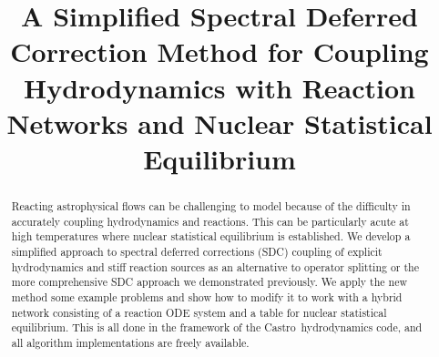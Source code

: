 \documentclass[times,modern]{aastex63}
\newcommand{\castro}{{\sf Castro}}
\begin{document}
\title{A Simplified Spectral Deferred Correction Method for Coupling Hydrodynamics with Reaction Networks and Nuclear Statistical Equilibrium}

\shortauthors{}








\begin{abstract}
Reacting astrophysical flows can be challenging to model because of
the difficulty in accurately coupling hydrodynamics and reactions.
This can be particularly acute at high temperatures where nuclear
statistical equilibrium is established.  We develop a simplified
approach to spectral deferred corrections (SDC) coupling of explicit
hydrodynamics and stiff reaction sources as an alternative to operator
splitting or the more comprehensive SDC approach we demonstrated
previously.  We apply the new method some example problems and show
how to modify it to work with a hybrid network consisting of a
reaction ODE system and a table for nuclear statistical equilibrium.
This is all done in the framework of the \castro\ hydrodynamics code,
and all algorithm implementations are freely available.
\end{abstract}
\end{document}
